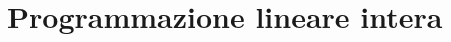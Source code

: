 \documentclass[\main/main.tex]{subfiles}
\begin{document}
\chapter{Programmazione lineare intera}
\end{document}
